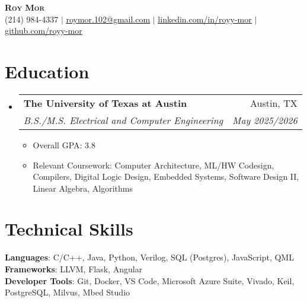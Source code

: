 \documentclass[letterpaper,11pt]{article}
\makeatletter
\newcommand{\resumeItem}[1]{
  \item\small{
    {#1 \vspace{-2pt}}
  }
}
\newcommand{\resumeSubheading}[4]{
  \vspace{-2pt}\item
    \begin{tabular*}{0.97\textwidth}[t]{l@{\extracolsep{\fill}}r}
      \textbf{#1} & #2 \\
      \textit{\small#3} & \textit{\small #4} \\
    \end{tabular*}\vspace{-7pt}
}
\newcommand{\resumeSubHeadingListStart}{\begin{itemize}[leftmargin=0.15in, label={}]}
\newcommand{\resumeSubHeadingListEnd}{\end{itemize}}
\newcommand{\resumeItemListStart}{\begin{itemize}}
\newcommand{\resumeItemListEnd}{\end{itemize}\vspace{-5pt}}
\makeatother
\begin{document}
\begin{center}
  \textbf{\Huge \scshape Roy Mor} \\ \vspace{1pt}
  \small (214) 984-4337 $|$ \href{mailto:x@x.com}{\underline{roymor.102@gmail.com}} $|$ 
  \href{https://linkedin.com/in/royy-mor/}{\underline{linkedin.com/in/royy-mor}} $|$
  \href{https://github.com/royy-mor}{\underline{github.com/royy-mor}}
\end{center}



\section{Education}
  \resumeSubHeadingListStart
    \resumeSubheading
      {The University of Texas at Austin}{Austin, TX}
      {B.S./M.S. Electrical and Computer Engineering}{May 2025/2026}
      \resumeItemListStart
        \resumeItem{Overall GPA: 3.8}
        \resumeItem{Relevant Coursework: Computer Architecture, ML/HW Codesign, Compilers, Digital Logic Design, Embedded Systems, Software Design II, Linear Algebra, Algorithms}
      \resumeItemListEnd

  \resumeSubHeadingListEnd

\section{Technical Skills}
 \begin{itemize}[leftmargin=0.15in, label={}]
    \small{\item{
     \textbf{Languages}{: C/C++, Java, Python, Verilog, SQL (Postgres), JavaScript, QML} \\
     \textbf{Frameworks}{: LLVM, Flask, Angular} \\
     \textbf{Developer Tools}{: Git, Docker, VS Code, Microsoft Azure Suite, Vivado, Keil, PostgreSQL, Milvus, Mbed Studio} \\
    }}
 \end{itemize}
\end{document}
